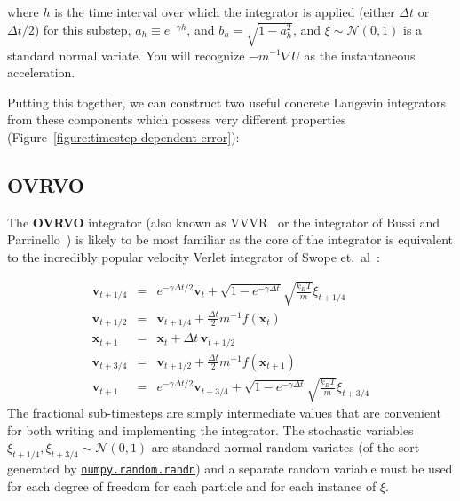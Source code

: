 \documentclass[aip,jcp,preprint,superscriptaddress,floatfix]{revtex4-1}
\newcommand{\x}{\mathbf{x}}
\newcommand{\vel}{\mathbf{v}}
\newcommand{\splitting}[1]{{\bf \sf #1}} %
\begin{document}
where $h$ is the time interval over which the integrator is applied (either $\Delta t$ or $\Delta t / 2$) for this substep, $a_h \equiv e^{-\gamma h}$, and $b_h = \sqrt{1 - a_h^2}$, and $\xi \sim \mathcal{N}(0,1)$ is a standard normal variate.
You will recognize $-m^{-1} \nabla U$ as the instantaneous acceleration.

Putting this together, we can construct two useful concrete Langevin integrators from these components which possess very different properties (Figure~\ref{figure:timestep-dependent-error}):

\subsection{\splitting{OVRVO}}

The \splitting{OVRVO} integrator (also known as VVVR~\cite{VVVR} or the integrator of Bussi and Parrinello~\cite{BussiParrinello}) is likely to be most familiar as the core of the integrator is equivalent to the incredibly popular velocity Verlet integrator of Swope et.~al~\cite{VelocityVerlet}:

\begin{eqnarray}
\vel_{t+1/4} &=& e^{-\gamma \Delta t / 2} \vel_t + \sqrt{1 - e^{-\gamma \Delta t}} \sqrt{\frac{k_B T}{m}} \xi_{t+1/4} \nonumber \\
\vel_{t+1/2} &=& \vel_{t+1/4} +  \frac{\Delta t}{2} m^{-1} f(\x_t) \nonumber \\
\x_{t+1} &=& \x_t + \Delta t \, \vel_{t+1/2} \nonumber \\
\vel_{t+3/4} &=& \vel_{t+1/2} +  \frac{\Delta t}{2} m^{-1} f(\x_{t+1}) \nonumber \\
\vel_{t+1} &=& e^{-\gamma \Delta t / 2} \vel_{t+3/4} + \sqrt{1 - e^{-\gamma \Delta t}} \sqrt{\frac{k_B T}{m}} \xi_{t+3/4} 
\end{eqnarray}
The fractional sub-timesteps are simply intermediate values that are convenient for both writing and implementing the integrator.
The stochastic variables $\xi_{t+1/4}, \xi_{t+3/4} \sim \mathcal{N}(0,1)$ are standard normal random variates (of the sort generated by \href{https://docs.scipy.org/doc/numpy/reference/generated/numpy.random.randn.html}{\tt numpy.random.randn}) and a separate random variable must be used for each degree of freedom for each particle and for each instance of $\xi$.
\end{document}
